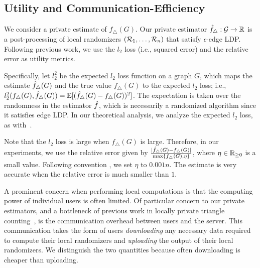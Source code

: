 \subsection{Utility and Communication-Efficiency}
\label{sub:utility_communication_efficiency}
We consider a private estimate of $f_\triangle(G)$. 
Our private estimator $\hat{f}_\triangle : \mathcal{G} \rightarrow \mathbb{R}$ is a post-processing of 
local randomizers $(\mathcal{R}_1, \ldots, \mathcal{R}_n)$ 
that 
satisfy $\epsilon$-edge LDP.
Following previous work, we use the $l_2$ loss (i.e., squared error)
\cite{Kairouz_ICML16,Wang_USENIX17,Murakami_USENIX19} and the relative error 
\cite{Bindschaedler_SP16,Chen_CCS12,Xiao_SIGMOD11} 
as utility metrics.

Specifically,
let $l_2^2$ be the expected $l_2$ loss function on a graph $G$, which maps the 
estimate $\hat{f}_\triangle(G)$ and the true value $f_\triangle(G)$ to the expected $l_2$ loss; i.e., 
$l_2^2(f_\triangle(G), \hat{f}_\triangle(G)) = \mathbb{E}[(\hat{f}_\triangle(G) - f_\triangle(G))^2]$.
The 
expectation is taken over the randomness in the estimator $\hat{f}$, which is
necessarily a randomized algorithm since it satisfies edge LDP.
In our theoretical analysis, we analyze the expected $l_2$ loss, as with~\cite{Kairouz_ICML16,Wang_USENIX17,Murakami_USENIX19}.

Note that the $l_2$ loss is large when $f_\triangle(G)$ is large. 
Therefore, in our experiments, we use the relative error given by $\frac{|\hat{f}_\triangle(G) - f_\triangle(G)|}{\max\{f_\triangle(G), \eta\}}$, 
where $\eta \in \mathbb{R}_{\ge0}$ is a small value. 
Following convention 
\cite{Bindschaedler_SP16,Chen_CCS12,Xiao_SIGMOD11}, 
we set $\eta$ to $0.001n$. 
The estimate is very accurate when the relative error is much smaller than $1$.

\smallskip
{}
A prominent concern when performing local computations is that the computing power of
individual users is often limited. Of particular concern to our private
estimators, and a bottleneck of previous work in locally private triangle
counting~\cite{Imola_USENIX21}, is the communication overhead between users and
the server. This communication takes the form of users 
\emph{downloading} any necessary data required to compute their local randomizers and 
\emph{uploading} the output of their local randomizers. We distinguish the two
quantities because often downloading is cheaper than uploading.

